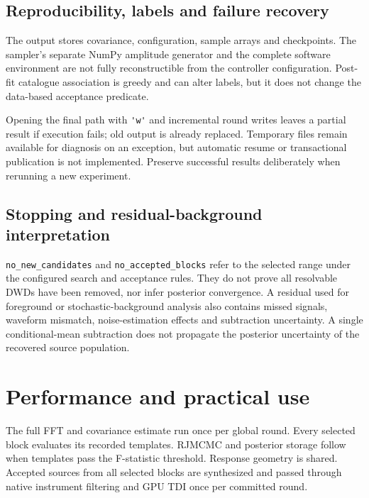 \documentclass[11pt,a4paper]{article}
\newcommand{\code}[1]{\texttt{\nolinkurl{#1}}}
\begin{document}
\subsection{Reproducibility, labels and failure recovery}

The output stores covariance, configuration, sample arrays and checkpoints.
The sampler's separate NumPy amplitude generator and the complete software
environment are not fully reconstructible from the controller configuration.
Post-fit catalogue association is greedy and can alter labels, but it does
not change the data-based acceptance predicate.

Opening the final path with \code{'w'} and incremental round writes leaves
a partial result if execution fails; old output is already replaced.
Temporary files remain available for diagnosis on an exception, but automatic
resume or transactional publication is not implemented. Preserve successful
results deliberately when rerunning a new experiment.

\subsection{Stopping and residual-background interpretation}

\code{no_new_candidates} and \code{no_accepted_blocks} refer to the selected
range under the configured search and acceptance rules. They do not prove
all resolvable DWDs have been removed, nor infer posterior convergence.
A residual used for foreground or stochastic-background analysis also contains
missed signals, waveform mismatch, noise-estimation effects and subtraction
uncertainty. A single conditional-mean subtraction does not propagate the
posterior uncertainty of the recovered source population.

\section{Performance and practical use}
\label{sec:performance}

The full FFT and covariance estimate run once per global round. Every selected
block evaluates its recorded templates. RJMCMC and posterior storage follow
when templates pass the F-statistic threshold. Response geometry is
shared. Accepted sources from all selected blocks are synthesized and passed
through native instrument filtering and GPU TDI once per committed round.
\end{document}
